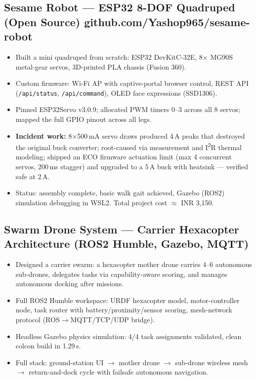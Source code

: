 \documentclass[10pt]{article}
\newcommand{\itemhead}[1]{\textbf{#1}}
\begin{document}
\subsection{Sesame Robot --- ESP32 8-DOF Quadruped (Open Source) \hfill github.com/Yashop965/sesame-robot}
\begin{itemize}
  \item Built a mini quadruped from scratch: ESP32 DevKitC-32E, 8$\times$ MG90S metal-gear servos, 3D-printed PLA chassis (Fusion 360).
  \item Custom firmware: Wi-Fi AP with captive-portal browser control, REST API (\texttt{/api/status}, \texttt{/api/command}), OLED face expressions (SSD1306).
  \item Pinned ESP32Servo v3.0.9; allocated PWM timers 0--3 across all 8 servos; mapped the full GPIO pinout across all legs.
  \item \itemhead{Incident work:} 8$\times$500\,mA servo draws produced 4\,A peaks that destroyed the original buck converter; root-caused via measurement and I\textsuperscript{2}R thermal modeling; shipped an ECO firmware actuation limit (max 4 concurrent servos, 200\,ms stagger) and upgraded to a 5\,A buck with heatsink --- verified safe at 2\,A.
  \item Status: assembly complete, basic walk gait achieved, Gazebo (ROS2) simulation debugging in WSL2. Total project cost $\approx$ INR 3,150.
\end{itemize}

\subsection{Swarm Drone System --- Carrier Hexacopter Architecture \hfill (ROS2 Humble, Gazebo, MQTT)}
\begin{itemize}
  \item Designed a carrier swarm: a hexacopter mother drone carries 4--6 autonomous sub-drones, delegates tasks via capability-aware scoring, and manages autonomous docking after missions.
  \item Full ROS2 Humble workspace: URDF hexacopter model, motor-controller node, task router with battery/proximity/sensor scoring, mesh-network protocol (ROS$\to$MQTT/TCP/UDP bridge).
  \item Headless Gazebo physics simulation: 4/4 task assignments validated, clean colcon build in 1.29\,s.
  \item Full stack: ground-station UI $\to$ mother drone $\to$ sub-drone wireless mesh $\to$ return-and-dock cycle with failsafe autonomous navigation.
\end{itemize}
\end{document}
